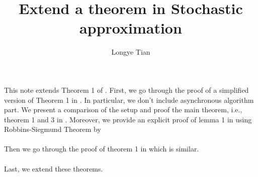 
\title{Extend a theorem in Stochastic approximation}
\author{Longye Tian}

\maketitle
This note extends Theorem 1 of \cite{tsitsiklis1994asynchronous}. First, we go through the proof of a simplified version of Theorem 1 in \cite{tsitsiklis1994asynchronous}. In particular, we don't include asynchronous algorithm part. We present a comparison of the setup and proof the main theorem, i.e., theorem 1 and 3 in \cite{tsitsiklis1994asynchronous}. Moreover, we provide an explicit proof of lemma 1 in \cite{tsitsiklis1994asynchronous} using Robbins-Siegmund Theorem by \cite{robbins1971convergence}\\
\\
Then we go through the proof of theorem 1 in \cite{jaakkola1993convergence} which is similar.\\
\\
Last, we extend these theorems.
\tableofcontents
\newpage






\newpage



